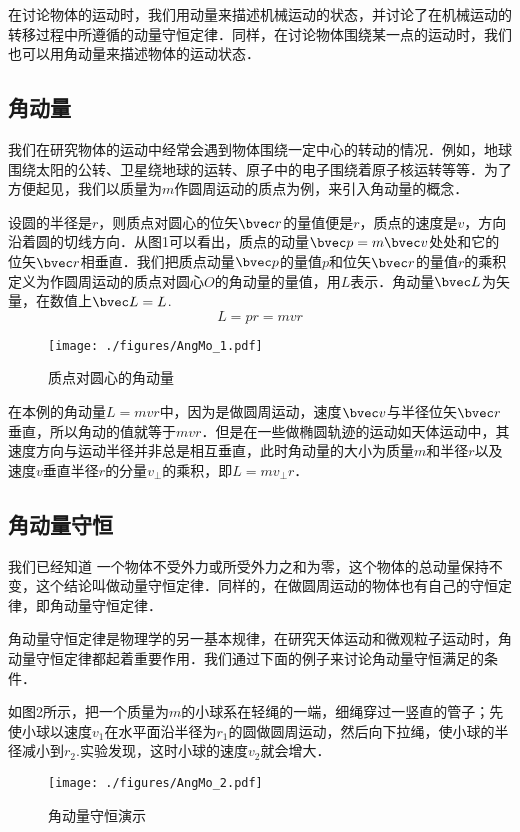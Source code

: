 
\begin{issues}
\issueTODO
\end{issues}

在讨论物体的运动时，我们用动量来描述机械运动的状态，并讨论了在机械运动的转移过程中所遵循的动量守恒定律．同样，在讨论物体围绕某一点的运动时，我们也可以用角动量来描述物体的运动状态．
\subsection{角动量}
我们在研究物体的运动中经常会遇到物体围绕一定中心的转动的情况．例如，地球围绕太阳的公转、卫星绕地球的运转、原子中的电子围绕着原子核运转等等．为了方便起见，我们以质量为$m$作圆周运动的质点为例，来引入角动量的概念．

设圆的半径是$r$，则质点对圆心的位矢$\bvec r$的量值便是$r$，质点的速度是$v$，方向沿着圆的切线方向．从图1可以看出，质点的动量$\bvec p = m\bvec v$处处和它的位矢$\bvec r$相垂直．我们把质点动量$\bvec p$的量值$p$和位矢$\bvec r$的量值$r$的乘积定义为作圆周运动的质点对圆心$O$的角动量的量值，用$L$表示．角动量$\bvec L$为矢量，在数值上$\bvec L = L$.
\begin{equation}
L = pr = mvr
\end{equation}
\begin{figure}[ht]
\centering
\texttt{[image: ./figures/AngMo\_1.pdf]}
\caption{质点对圆心的角动量} \label{AngMo_fig1}
\end{figure}

在本例的角动量$L=mvr$中，因为是做圆周运动，速度$\bvec v$与半径位矢$\bvec r$垂直，所以角动的值就等于$mvr$．但是在一些做椭圆轨迹的运动如天体运动中，其速度方向与运动半径并非总是相互垂直，此时角动量的大小为质量$m$和半径$r$以及速度$v$垂直半径$r$的分量$v_{\perp}$的乘积，即$L=m v_{\perp}r$．
\subsection{角动量守恒}
我们已经知道 一个物体不受外力或所受外力之和为零，这个物体的总动量保持不变，这个结论叫做动量守恒定律．同样的，在做圆周运动的物体也有自己的守恒定律，即角动量守恒定律．

角动量守恒定律是物理学的另一基本规律，在研究天体运动和微观粒子运动时，角动量守恒定律都起着重要作用．我们通过下面的例子来讨论角动量守恒满足的条件．

如图2所示，把一个质量为$m$的小球系在轻绳的一端，细绳穿过一竖直的管子；先使小球以速度$v_1$在水平面沿半径为$r_1$的圆做圆周运动，然后向下拉绳，使小球的半径减小到$r_2$.实验发现，这时小球的速度$v_2$就会增大．
\begin{figure}[ht]
\centering
\texttt{[image: ./figures/AngMo\_2.pdf]}
\caption{角动量守恒演示} \label{AngMo_fig2}
\end{figure}

